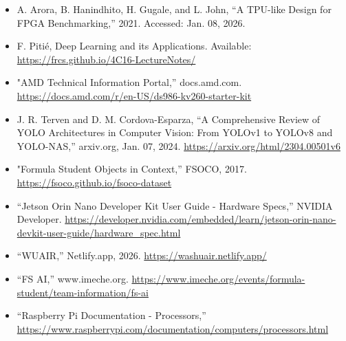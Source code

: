\documentclass[11pt,a4paper,twoside]{article}
\begin{document}
\begin{itemize}
    \item [1] A. Arora, B. Hanindhito, H. Gugale, and L. John, “A TPU-like Design for FPGA Benchmarking,” 2021. Accessed: Jan. 08, 2026.
    \item [2] F. Pitié, Deep Learning and its Applications. Available: \url{https://frcs.github.io/4C16-LectureNotes/}
    \item [3] "AMD Technical Information Portal,” docs.amd.com. \url{https://docs.amd.com/r/en-US/ds986-kv260-starter-kit}
    \item [4] J. R. Terven and D. M. Cordova-Esparza, “A Comprehensive Review of YOLO Architectures in Computer Vision: From YOLOv1 to YOLOv8 and YOLO-NAS,” arxiv.org, Jan. 07, 2024. \url{https://arxiv.org/html/2304.00501v6} 
    \item [5] "Formula Student Objects in Context,” FSOCO, 2017. \url{https://fsoco.github.io/fsoco-dataset}
    \item [6] “Jetson Orin Nano Developer Kit User Guide - Hardware Specs,” NVIDIA Developer. \url{https://developer.nvidia.com/embedded/learn/jetson-orin-nano-devkit-user-guide/hardware_spec.html}
    \item [7] “WUAIR,” Netlify.app, 2026. \url{https://washuair.netlify.app/}
    \item [8] “FS AI,” www.imeche.org. \url{https://www.imeche.org/events/formula-student/team-information/fs-ai}
    \item [9] “Raspberry Pi Documentation - Processors,” \url{https://www.raspberrypi.com/documentation/computers/processors.html}
\end{itemize}
\end{document}

